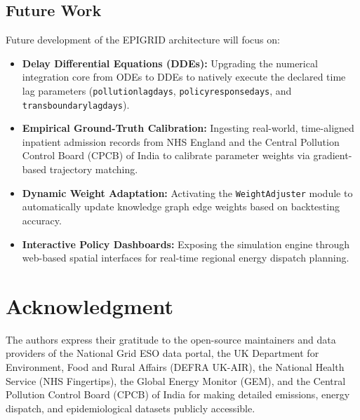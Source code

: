 \documentclass[conference]{IEEEtran}
\renewcommand{\_}{\textunderscore\allowbreak{}}%
\begin{document}
\subsection{Future Work}
Future development of the EPIGRID architecture will focus on:
\begin{itemize}
    \item \textbf{Delay Differential Equations (DDEs):} Upgrading the numerical integration core from ODEs to DDEs to natively execute the declared time lag parameters (\texttt{pollution\_lag\_days}, \texttt{policy\_response\_days}, and \texttt{transboundary\_lag\_days}).
    \item \textbf{Empirical Ground-Truth Calibration:} Ingesting real-world, time-aligned inpatient admission records from NHS England and the Central Pollution Control Board (CPCB) of India to calibrate parameter weights via gradient-based trajectory matching.
    \item \textbf{Dynamic Weight Adaptation:} Activating the \texttt{WeightAdjuster} module to automatically update knowledge graph edge weights based on backtesting accuracy.
    \item \textbf{Interactive Policy Dashboards:} Exposing the simulation engine through web-based spatial interfaces for real-time regional energy dispatch planning.
\end{itemize}

\section*{Acknowledgment}
The authors express their gratitude to the open-source maintainers and data providers of the National Grid ESO data portal, the UK Department for Environment, Food and Rural Affairs (DEFRA UK-AIR), the National Health Service (NHS Fingertips), the Global Energy Monitor (GEM), and the Central Pollution Control Board (CPCB) of India for making detailed emissions, energy dispatch, and epidemiological datasets publicly accessible.
\end{document}
